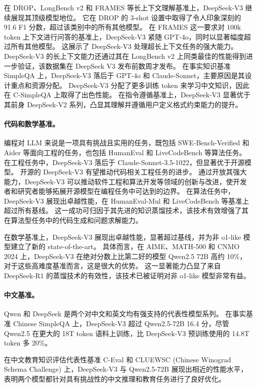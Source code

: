 \documentclass[11pt, a4paper, logo, copyright, nonumbering]{deepseek}
\newcommand{\dsvii}{DeepSeek-V2}
\newcommand{\dsviii}{DeepSeek-V3}
\begin{document}
在 DROP、LongBench v2 和 FRAMES 等长上下文理解基准上，\dsviii{} 继续展现其顶级模型地位。
它在 DROP 的 3-shot 设置中取得了令人印象深刻的 91.6 F1 分数，超过该类别中的所有其他模型。
在 FRAMES 这一要求对 100k token 上下文进行问答的基准上，\dsviii{} 紧随 GPT-4o，同时以显著幅度超过所有其他模型。
这展示了 \dsviii{} 处理超长上下文任务的强大能力。
\dsviii{} 的长上下文能力还通过其在 LongBench v2 上同类最佳的性能得到进一步验证，该数据集在 DeepSeek V3 发布前数周才发布。
在事实知识基准 SimpleQA 上，\dsviii{} 落后于 GPT-4o 和 Claude-Sonnet，主要原因是其设计重点和资源分配。
\dsviii{} 分配了更多训练 token 来学习中文知识，因此在 C-SimpleQA 上取得了出色性能。
在指令遵循基准上，\dsviii{} 显著优于其前身 \dsvii{} 系列，凸显其理解并遵循用户定义格式约束能力的提升。

\paragraph{代码和数学基准。}
编程对 LLM 来说是一项具有挑战且实用的任务，既包括 SWE-Bench-Verified 和 Aider 等面向工程的任务，也包括 HumanEval 和 LiveCodeBench 等算法任务。
在工程任务中，\dsviii{} 落后于 Claude-Sonnet-3.5-1022，但显著优于开源模型。
开源的 \dsviii{} 有望推动代码相关工程任务的进步。
通过开放其强大能力，\dsviii{} 可以推动软件工程和算法开发等领域的创新与改进，使开发者和研究者能够拓展开源模型在编程任务中可达到的边界。
在算法任务中，\dsviii{} 展现出卓越性能，在 HumanEval-Mul 和 LiveCodeBench 等基准上超过所有基线。
这一成功可归因于其先进的知识蒸馏技术，该技术有效增强了其在算法型任务中的代码生成和问题求解能力。

在数学基准上，\dsviii{} 展现出卓越性能，显著超过基线，并为非 o1-like 模型建立了新的 state-of-the-art。
具体而言，在 AIME、MATH-500 和 CNMO 2024 上，\dsviii{} 在绝对分数上比第二好的模型 Qwen2.5 72B 高约 10\%，对于这些高难度基准而言，这是很大的优势。
这一显著能力凸显了来自 DeepSeek-R1 的蒸馏技术的有效性，该技术已被证明对非 o1-like 模型非常有益。

\paragraph{中文基准。}
Qwen 和 DeepSeek 是两个对中文和英文均有强支持的代表性模型系列。
在事实基准 Chinese SimpleQA 上，\dsviii{} 超过 Qwen2.5-72B 16.4 分，尽管 Qwen2.5 在更大的 18T token 语料上训练，比 \dsviii{} 预训练使用的 14.8T token 多 20\%。

在中文教育知识评估代表性基准 C-Eval 和 CLUEWSC (Chinese Winograd Schema Challenge) 上，\dsviii{} 与 Qwen2.5-72B 展现出相近的性能水平，表明两个模型都针对具有挑战性的中文推理和教育任务进行了良好优化。
\end{document}
